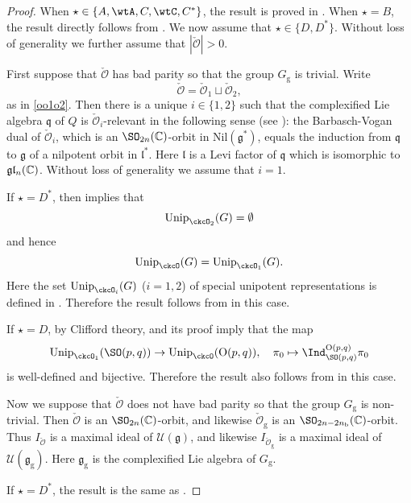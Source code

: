\documentclass[11pt,a4paper]{amsart}
\def\abs#1{\left|{#1}\right|}
\newcommand{\CO}{{\mathcal {O}}}
\newcommand{\CU}{{\mathcal {U}}}
\newcommand{\oO}{\operatorname{O}}
\newcommand{\g}{\mathfrak g}
\numberwithin{equation}{section}
\theoremstyle{remark}
\def\Unip{\mathrm{Unip}}
\begin{document}
\begin{proof}
When $\star\in\{A, \wtA, C, \wtC, C^*\}$, the result is proved in  \cite[Theorems 2.17 and 2.21]{BMSZa}. When $\star=B$, the result directly follows from \cite[Theorem 2.21]{BMSZa}. We now assume that $\star\in \{D, D^*\}$. Without loss of generality we further assume that $\abs{\check \CO}>0$.


First suppose that $\check \CO$ has bad parity so that the group $G_\mathrm g$ is trivial. Write
\[
  \check \CO=\check \CO_1\sqcup \check \CO_2,
\]
as in \eqref{oo1o2}.  Then there is a unique $i\in \{1,2\}$ such that the complexified Lie algebra $\mathfrak q$ of $Q$ is   $\check \CO_i$-relevant in the following sense (see \cite[Section 2.6]{BMSZa}): the Barbasch-Vogan dual of $\check \CO_i$, which is an $\SO_{2n}(\C)$-orbit in $\mathrm{Nil}(\g^*)$,  equals the induction from $\mathfrak q$ to $\g$ of a nilpotent orbit  in $\mathfrak l^*$. Here $\mathfrak l$ is a Levi factor of $\mathfrak q$ which is isomorphic to $\g\mathfrak l_n(\C)$.
Without loss of generality we assume that $i=1$.

If $\star=D^*$, then \cite[Theorem 2.21]{BMSZa} implies that
\[
  \Unip_{\ckcO_2 }(G)=\emptyset
\]
and hence
\[
  \Unip_{\ckcO }(G)=\Unip_{\ckcO_1 }(G).
\]
Here the set $\Unip_{\ckcO_i }(G)$ ($i=1,2$) of special unipotent representations is defined in \cite[Section 2.3]{BMSZa}.  Therefore the result follows from \cite[Theorem 2.21]{BMSZa} in this case.


If $\star=D$,  by Clifford theory,  and its proof imply that the map
\[
  \Unip_{\ckcO_1 }(\SO(p,q))\rightarrow \Unip_{\ckcO }(\oO(p,q)), \quad \pi_0\mapsto \Ind_{\SO(p,q)}^{\oO(p,q)} \pi_0
\]
is well-defined and bijective. Therefore the result also follows from \cite[Theorem 2.21]{BMSZa} in this case.



Now we  suppose that $\check \CO$ does not have bad parity so that the group $G_\mathrm g$ is non-trivial.
Then $\check \CO$ is an $\SO_{2n}(\C)$-orbit, and likewise $\check \CO_\mathrm g$ is an $\SO_{2n-2n_\mathrm b}(\C)$-orbit. Thus $I_{\check \CO}$ is a maximal ideal of $\CU(\g)$, and likewise $I_{\check \CO_\mathrm g}$ is a maximal ideal of $\CU(\g_\mathrm g)$. Here  $\g_\mathrm g$ is the complexified Lie algebra of $G_\mathrm g$.

If $\star=D^*$, the result is the same as  \cite[Theorem 2.21]{BMSZa}.


\end{proof}
\end{document}
